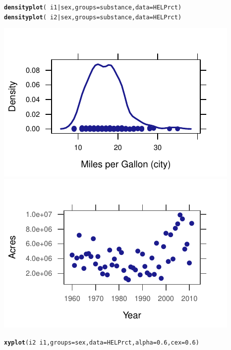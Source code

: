 \documentclass[twoside]{book}\usepackage[]{graphicx}\usepackage[]{xcolor}
\makeatletter
\def\maxwidth{ %
  \ifdim\Gin@nat@width>\linewidth
    \linewidth
  \else
    \Gin@nat@width
  \fi
}
\newcommand{\hlnum}[1]{\textcolor[rgb]{0.686,0.059,0.569}{#1}}%
\newcommand{\hlopt}[1]{\textcolor[rgb]{0,0,0}{#1}}%
\newcommand{\hlstd}[1]{\textcolor[rgb]{0.345,0.345,0.345}{#1}}%
\newcommand{\hlkwc}[1]{\textcolor[rgb]{0.333,0.667,0.333}{#1}}%
\newcommand{\hlkwd}[1]{\textcolor[rgb]{0.737,0.353,0.396}{\textbf{#1}}}%
\newenvironment{kframe}{%
 \def\at@end@of@kframe{}%
 \ifinner\ifhmode%
  \def\at@end@of@kframe{\end{minipage}}%
  \begin{minipage}{\columnwidth}%
 \fi\fi%
 \def\FrameCommand##1{\hskip\@totalleftmargin \hskip-\fboxsep
 \colorbox{shadecolor}{##1}\hskip-\fboxsep
     \hskip-\linewidth \hskip-\@totalleftmargin \hskip\columnwidth}%
 \MakeFramed {\advance\hsize-\width
   \@totalleftmargin\z@ \linewidth\hsize
   \@setminipage}}%
 {\par\unskip\endMakeFramed%
 \at@end@of@kframe}
\newenvironment{knitrout}{}{} %
\makeatother
\begin{document}
\begin{solution}
\begin{knitrout}
\end{knitrout}
\begin{knitrout}
\color{fgcolor}\begin{kframe}
\begin{alltt}
\hlkwd{densityplot}\hlstd{(}\hlopt{~}\hlstd{i1} \hlopt{|} \hlstd{sex,} \hlkwc{groups} \hlstd{= substance,} \hlkwc{data} \hlstd{= HELPrct)}
\hlkwd{densityplot}\hlstd{(}\hlopt{~}\hlstd{i2} \hlopt{|} \hlstd{sex,} \hlkwc{groups} \hlstd{= substance,} \hlkwc{data} \hlstd{= HELPrct)}
\end{alltt}
\end{kframe}

{\centering \includegraphics[width=\maxwidth]{figures/fig-unnamed-chunk-26-1} 
\includegraphics[width=\maxwidth]{figures/fig-unnamed-chunk-26-2} 

}



\end{knitrout}
\begin{knitrout}
\color{fgcolor}\begin{kframe}
\begin{alltt}
\hlkwd{xyplot}\hlstd{(i2} \hlopt{~} \hlstd{i1,} \hlkwc{groups} \hlstd{= sex,} \hlkwc{data} \hlstd{= HELPrct,} \hlkwc{alpha} \hlstd{=} \hlnum{0.6}\hlstd{,} \hlkwc{cex} \hlstd{=} \hlnum{0.6}\hlstd{)}
\end{alltt}
\end{kframe}


\end{knitrout}
\end{solution}
\end{document}
